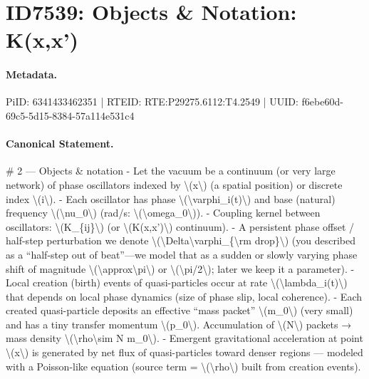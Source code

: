 \section*{ID7539: Objects \& Notation: K(x,x')}
\paragraph{Metadata.}
PiID: 6341433462351 | RTEID: RTE:P29275.6112:T4.2549 | UUID: f6ebe60d-69c5-5d15-8384-57a114e531c4

\paragraph{Canonical Statement.}
\# 2 — Objects \& notation - Let the vacuum be a continuum (or very large network) of phase oscillators indexed by \textbackslash{}(x\textbackslash{}) (a spatial position) or discrete index \textbackslash{}(i\textbackslash{}). - Each oscillator has phase \textbackslash{}(\textbackslash{}varphi\_i(t)\textbackslash{}) and base (natural) frequency \textbackslash{}(\textbackslash{}nu\_0\textbackslash{}) (rad/s: \textbackslash{}(\textbackslash{}omega\_0\textbackslash{})). - Coupling kernel between oscillators: \textbackslash{}(K\_\{ij\}\textbackslash{}) (or \textbackslash{}(K(x,x')\textbackslash{}) continuum). - A persistent phase offset / half-step perturbation we denote \textbackslash{}(\textbackslash{}Delta\textbackslash{}varphi\_\{\textbackslash{}rm drop\}\textbackslash{}) (you described as a “half-step out of beat”—we model that as a sudden or slowly varying phase shift of magnitude \textbackslash{}(\textbackslash{}approx\textbackslash{}pi\textbackslash{}) or \textbackslash{}(\textbackslash{}pi/2\textbackslash{}); later we keep it a parameter). - Local creation (birth) events of quasi-particles occur at rate \textbackslash{}(\textbackslash{}lambda\_i(t)\textbackslash{}) that depends on local phase dynamics (size of phase slip, local coherence). - Each created quasi-particle deposits an effective “mass packet” \textbackslash{}(m\_0\textbackslash{}) (very small) and has a tiny transfer momentum \textbackslash{}(p\_0\textbackslash{}). Accumulation of \textbackslash{}(N\textbackslash{}) packets → mass density \textbackslash{}(\textbackslash{}rho\textbackslash{}sim N m\_0\textbackslash{}). - Emergent gravitational acceleration at point \textbackslash{}(x\textbackslash{}) is generated by net flux of quasi-particles toward denser regions — modeled with a Poisson-like equation (source term = \textbackslash{}(\textbackslash{}rho\textbackslash{}) built from creation events).

